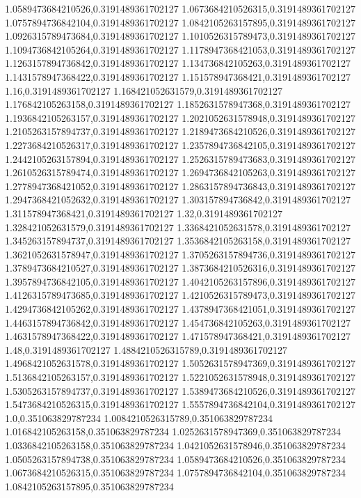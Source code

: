 1.0589473684210526,0.3191489361702127
1.0673684210526315,0.3191489361702127
1.0757894736842104,0.3191489361702127
1.0842105263157895,0.3191489361702127
1.0926315789473684,0.3191489361702127
1.1010526315789473,0.3191489361702127
1.1094736842105264,0.3191489361702127
1.1178947368421053,0.3191489361702127
1.1263157894736842,0.3191489361702127
1.134736842105263,0.3191489361702127
1.1431578947368422,0.3191489361702127
1.151578947368421,0.3191489361702127
1.16,0.3191489361702127
1.168421052631579,0.3191489361702127
1.176842105263158,0.3191489361702127
1.1852631578947368,0.3191489361702127
1.1936842105263157,0.3191489361702127
1.2021052631578948,0.3191489361702127
1.2105263157894737,0.3191489361702127
1.2189473684210526,0.3191489361702127
1.2273684210526317,0.3191489361702127
1.2357894736842105,0.3191489361702127
1.2442105263157894,0.3191489361702127
1.2526315789473683,0.3191489361702127
1.2610526315789474,0.3191489361702127
1.2694736842105263,0.3191489361702127
1.2778947368421052,0.3191489361702127
1.2863157894736843,0.3191489361702127
1.2947368421052632,0.3191489361702127
1.303157894736842,0.3191489361702127
1.311578947368421,0.3191489361702127
1.32,0.3191489361702127
1.328421052631579,0.3191489361702127
1.3368421052631578,0.3191489361702127
1.345263157894737,0.3191489361702127
1.3536842105263158,0.3191489361702127
1.3621052631578947,0.3191489361702127
1.3705263157894736,0.3191489361702127
1.3789473684210527,0.3191489361702127
1.3873684210526316,0.3191489361702127
1.3957894736842105,0.3191489361702127
1.4042105263157896,0.3191489361702127
1.4126315789473685,0.3191489361702127
1.4210526315789473,0.3191489361702127
1.4294736842105262,0.3191489361702127
1.4378947368421051,0.3191489361702127
1.4463157894736842,0.3191489361702127
1.454736842105263,0.3191489361702127
1.4631578947368422,0.3191489361702127
1.471578947368421,0.3191489361702127
1.48,0.3191489361702127
1.4884210526315789,0.3191489361702127
1.4968421052631578,0.3191489361702127
1.5052631578947369,0.3191489361702127
1.5136842105263157,0.3191489361702127
1.5221052631578948,0.3191489361702127
1.5305263157894737,0.3191489361702127
1.5389473684210526,0.3191489361702127
1.5473684210526315,0.3191489361702127
1.5557894736842104,0.3191489361702127
1.0,0.351063829787234
1.0084210526315789,0.351063829787234
1.016842105263158,0.351063829787234
1.0252631578947369,0.351063829787234
1.0336842105263158,0.351063829787234
1.0421052631578946,0.351063829787234
1.0505263157894738,0.351063829787234
1.0589473684210526,0.351063829787234
1.0673684210526315,0.351063829787234
1.0757894736842104,0.351063829787234
1.0842105263157895,0.351063829787234
